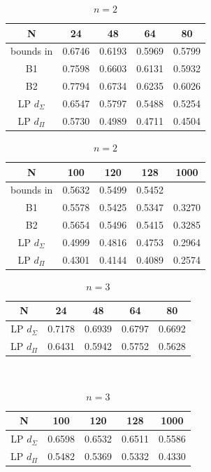 \documentclass[10pt]{article}
\begin{document}
\begin{table}
\noindent \begin{tabular}{|c|c|c|c|c|}
  \hline
  N & 24 & 48 & 64 & 80 \\
  \hline
  bounds in \cite{RECITE} & 0.6746 & 0.6193 & 0.5969 & 0.5799\\
  \hline
  B1 \cite{ROSEN} & 0.7598 & 0.6603 & 0.6131 & 0.5932\\
  \hline
  B2 \cite{ROSEN} & 0.7794 & 0.6734 & 0.6235 & 0.6026\\
  \hline
  LP $d_\Sigma$  & 0.6547 & 0.5797 & 0.5488 & 0.5254 \\
  \hline
  LP $d_\Pi$ & 0.5730 & 0.4989 & 0.4711 & 0.4504\\
  \hline
  \end{tabular}

 \vspace{10pt}


\noindent \begin{tabular}{|c|c|c|c|c|}
  \hline
  N & 100 & 120 & 128 & 1000\\
  \hline
  bounds in \cite{RECITE} & 0.5632 & 0.5499 & 0.5452 &\\
  \hline
  B1 \cite{ROSEN} & 0.5578 & 0.5425 & 0.5347 & 0.3270\\
  \hline
  B2 \cite{ROSEN} & 0.5654 & 0.5496 & 0.5415 & 0.3285\\
  \hline
  LP $d_\Sigma$ & 0.4999 & 0.4816 & 0.4753 & 0.2964\\
  \hline
  LP $d_\Pi$ & 0.4301 & 0.4144 & 0.4089 & 0.2574 \\
  \hline
 \end{tabular}
\caption{$n=2$}
\end{table}
 


\begin{table}

\noindent \begin{tabular}{|c|c|c|c|c|}
  \hline
  N & 24 & 48 & 64 & 80\\
  \hline
  LP $d_\Sigma$ & 0.7178 & 0.6939  &  0.6797& 0.6692 \\
  \hline
  LP $d_\Pi$ & 0.6431 & 0.5942 &0.5752 &  0.5628   \\
  \hline
 \end{tabular}\\

\vspace{10pt}

\noindent \begin{tabular}{|c|c|c|c|c|}
  \hline
  N & 100 & 120 & 128 & 1000\\
  \hline
  LP $d_\Sigma$ & 0.6598  & 0.6532 & 0.6511 & 0.5586 \\
  \hline
  LP $d_\Pi$ & 0.5482 & 0.5369 &  0.5332 & 0.4330 \\
  \hline
 \end{tabular}
\caption{$n=3$}
\end{table}
\end{document}
